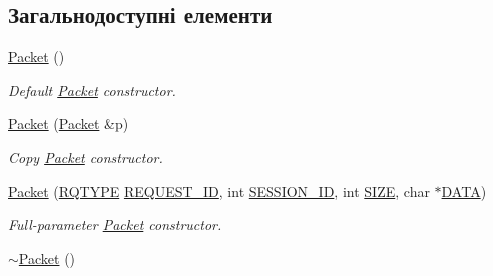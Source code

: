 \subsection*{Загальнодоступні елементи}
\begin{DoxyCompactItemize}
\item 
\hypertarget{classPacket_aabcfb963c0d5bc0fa554668f92989622}{\hyperlink{classPacket_aabcfb963c0d5bc0fa554668f92989622}{Packet} ()}\label{classPacket_aabcfb963c0d5bc0fa554668f92989622}

\begin{DoxyCompactList}\small\item\em Default \hyperlink{classPacket}{Packet} constructor. \end{DoxyCompactList}\item 
\hypertarget{classPacket_a30fc0d2e5589228708582af6b5b2a576}{\hyperlink{classPacket_a30fc0d2e5589228708582af6b5b2a576}{Packet} (\hyperlink{classPacket}{Packet} \&p)}\label{classPacket_a30fc0d2e5589228708582af6b5b2a576}

\begin{DoxyCompactList}\small\item\em Copy \hyperlink{classPacket}{Packet} constructor. \end{DoxyCompactList}\item 
\hyperlink{classPacket_a3b5e228aeb6b3b4988f69433a9ccfb57}{Packet} (\hyperlink{packet_8h_a15e96d9e79cfa4c3aaba6861be4707e3}{R\-Q\-T\-Y\-P\-E} \hyperlink{classPacket_a1e3e5174c14d3fa58d84e3449fbc8528}{R\-E\-Q\-U\-E\-S\-T\-\_\-\-I\-D}, int \hyperlink{classPacket_ab961c50e0041597c29c52d1e397c5f91}{S\-E\-S\-S\-I\-O\-N\-\_\-\-I\-D}, int \hyperlink{classPacket_a095ff3c0e41af547f0f7cc2464b0cb87}{S\-I\-Z\-E}, char $\ast$\hyperlink{classPacket_abc0a29f961bdd40de882e39601884866}{D\-A\-T\-A})
\begin{DoxyCompactList}\small\item\em Full-\/parameter \hyperlink{classPacket}{Packet} constructor. \end{DoxyCompactList}\item 
\hypertarget{classPacket_a48938391fb7e07460bb0e01198ae5ede}{\hyperlink{classPacket_a48938391fb7e07460bb0e01198ae5ede}{$\sim$\-Packet} ()}\label{classPacket_a48938391fb7e07460bb0e01198ae5ede}


\end{DoxyCompactItemize}
